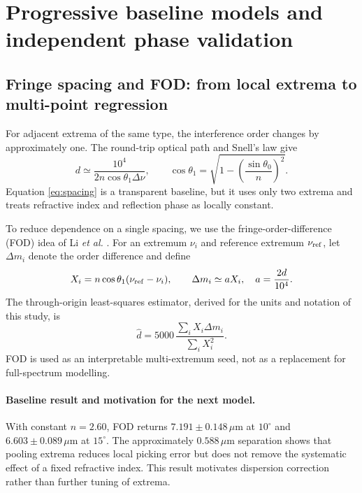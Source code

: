 \documentclass[10pt,a4paper]{article}
\newcommand{\um}{\ensuremath{\mu\mathrm{m}}}
\begin{document}
\section{Progressive baseline models and independent phase validation}
\subsection{Fringe spacing and FOD: from local extrema to multi-point regression}
For adjacent extrema of the same type, the interference order changes by approximately one. The round-trip optical path and Snell's law give
\begin{equation}
d\simeq\frac{10^4}{2n\cos\theta_1\Delta\nu},\qquad
\cos\theta_1=\sqrt{1-\left(\frac{\sin\theta_0}{n}\right)^2}.
\label{eq:spacing}
\end{equation}
Equation \eqref{eq:spacing} is a transparent baseline, but it uses only two extrema and treats refractive index and reflection phase as locally constant.

To reduce dependence on a single spacing, we use the fringe-order-difference (FOD) idea of Li \textit{et al.} \cite{Li2010}. For an extremum $\nu_i$ and reference extremum $\nu_{\rm ref}$, let $\Delta m_i$ denote the order difference and define
\begin{equation}
X_i=n\cos\theta_1(\nu_{\rm ref}-\nu_i),\qquad
\Delta m_i\simeq aX_i,\quad a=\frac{2d}{10^4}.
\end{equation}
The through-origin least-squares estimator, derived for the units and notation of this study, is
\begin{equation}
\hat d=5000\,\frac{\sum_iX_i\Delta m_i}{\sum_iX_i^2}.
\label{eq:fod}
\end{equation}
FOD is used as an interpretable multi-extremum seed, not as a replacement for full-spectrum modelling.

\paragraph{Baseline result and motivation for the next model.}
With constant $n=2.60$, FOD returns $7.191\pm0.148\,\um$ at $10^\circ$ and $6.603\pm0.089\,\um$ at $15^\circ$. The approximately $0.588\,\um$ separation shows that pooling extrema reduces local picking error but does not remove the systematic effect of a fixed refractive index. This result motivates dispersion correction rather than further tuning of extrema.
\end{document}
